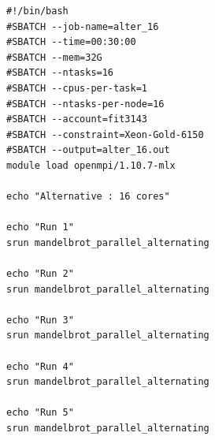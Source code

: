 \documentclass[conference]{IEEEtran}
\begin{document}
\newpage
\begin{lstlisting}[caption={MonARCH job script for 16 cores},label={16job}]
#!/bin/bash
#SBATCH --job-name=alter_16
#SBATCH --time=00:30:00
#SBATCH --mem=32G
#SBATCH --ntasks=16
#SBATCH --cpus-per-task=1
#SBATCH --ntasks-per-node=16
#SBATCH --account=fit3143
#SBATCH --constraint=Xeon-Gold-6150
#SBATCH --output=alter_16.out
module load openmpi/1.10.7-mlx

echo "Alternative : 16 cores"

echo "Run 1"
srun mandelbrot_parallel_alternating

echo "Run 2"
srun mandelbrot_parallel_alternating

echo "Run 3"
srun mandelbrot_parallel_alternating

echo "Run 4"
srun mandelbrot_parallel_alternating

echo "Run 5"
srun mandelbrot_parallel_alternating

\end{lstlisting}
\end{document}
